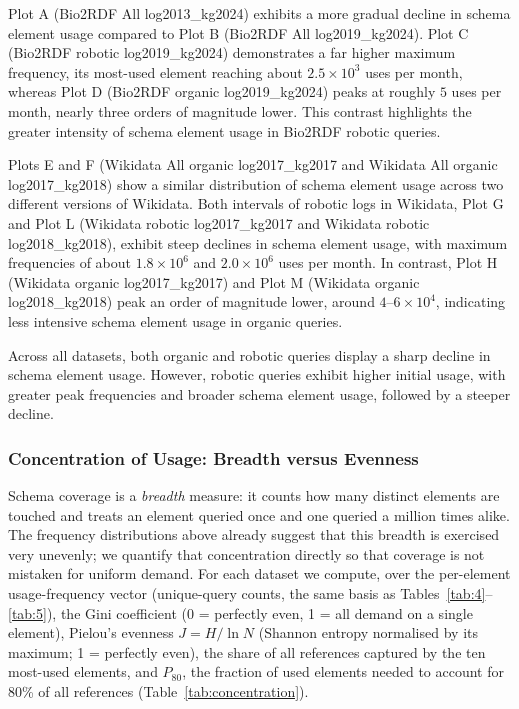 \documentclass[sw]{iosart2x}
\begin{document}
Plot A (Bio2RDF All log2013\_kg2024) exhibits a more gradual decline in schema element usage compared to Plot B (Bio2RDF All log2019\_kg2024). Plot C (Bio2RDF robotic log2019\_kg2024) demonstrates a far higher maximum frequency, its most-used element reaching about $2.5\times10^{3}$ uses per month, whereas Plot D (Bio2RDF organic log2019\_kg2024) peaks at roughly $5$ uses per month, nearly three orders of magnitude lower. This contrast highlights the greater intensity of schema element usage in Bio2RDF robotic queries.

Plots E and F (Wikidata All organic log2017\_kg2017 and Wikidata All organic log2017\_kg2018) show a similar distribution of schema element usage across two different versions of Wikidata. Both intervals of robotic logs in Wikidata, Plot G and Plot L (Wikidata robotic log2017\_kg2017 and Wikidata robotic log2018\_kg2018), exhibit steep declines in schema element usage, with maximum frequencies of about $1.8\times10^{6}$ and $2.0\times10^{6}$ uses per month. In contrast, Plot H (Wikidata organic log2017\_kg2017) and Plot M (Wikidata organic log2018\_kg2018) peak an order of magnitude lower, around $4$--$6\times10^{4}$, indicating less intensive schema element usage in organic queries.

Across all datasets, both organic and robotic queries display a sharp decline in schema element usage. However, robotic queries exhibit higher initial usage, with greater peak frequencies and broader schema element usage, followed by a steeper decline.


\subsubsection{Concentration of Usage: Breadth versus Evenness}\label{sec:concentration}
Schema coverage is a \emph{breadth} measure: it counts how many distinct elements are touched and treats an element queried once and one queried a million times alike. The frequency distributions above already suggest that this breadth is exercised very unevenly; we quantify that concentration directly so that coverage is not mistaken for uniform demand. For each dataset we compute, over the per-element usage-frequency vector (unique-query counts, the same basis as Tables~\ref{tab:4}--\ref{tab:5}), the Gini coefficient (0 = perfectly even, 1 = all demand on a single element), Pielou's evenness $J = H/\ln N$ (Shannon entropy normalised by its maximum; 1 = perfectly even), the share of all references captured by the ten most-used elements, and $P_{80}$, the fraction of used elements needed to account for 80\% of all references (Table~\ref{tab:concentration}).
\end{document}
